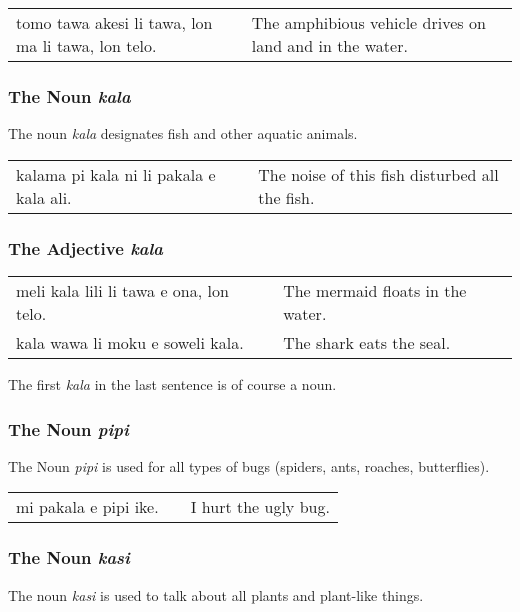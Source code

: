 \begin{supertabular}{p{5,5cm}|ll}
    tomo tawa akesi li tawa, lon ma li tawa, lon telo. &  & The amphibious vehicle drives on land and in the water. \\
\end{supertabular}

\subsubsection*{The Noun \textit{kala}}
The noun \textit{kala} designates fish and other aquatic animals.

\begin{supertabular}{p{5,5cm}|ll}
    kalama pi kala ni li pakala e kala ali. &  & The noise of this fish disturbed all the fish. \\
\end{supertabular}

\subsubsection*{The Adjective \textit{kala}}

\begin{supertabular}{p{5,5cm}|ll}
    meli kala lili li tawa e ona, lon telo. &  & The mermaid floats in the water. \\
    kala wawa li moku e soweli kala.        &  & The shark eats the seal.         \\
\end{supertabular}

The first \textit{kala} in the last sentence is of course a noun.

\subsubsection*{The Noun \textit{pipi}}
The Noun \textit{pipi} is used for all types of bugs (spiders, ants, roaches, butterflies).

\begin{supertabular}{p{5,5cm}|ll}
    mi pakala e pipi ike. &  & I hurt the ugly bug. \\
\end{supertabular}

\subsubsection*{The Noun \textit{kasi}}
The noun \textit{kasi} is used to talk about all plants and plant-like things.

